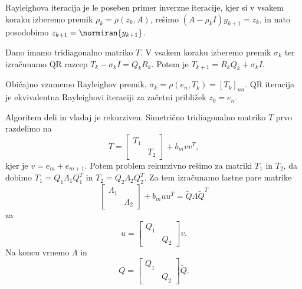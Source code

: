 
Rayleighova iteracija je le poseben primer inverzne iteracije, kjer si v vsakem
koraku izberemo premik $\rho_k = \rho(z_k, A)$, rešimo $(A - \rho_k I) y_{k+1} =
z_k$, in nato posodobimo $z_{k+1} = \normiran{y_{k+1}}$.


Dano imamo tridiagonalno matriko $T$.
V vsakem koraku izberemo premik $\sigma_k$ ter izračunamo QR razcep $T_k -
\sigma_k I = Q_k R_k$.
Potem je $T_{k+1} = R_k Q_k + \sigma_k I$.

Običajno vzamemo Rayleighov premik, $\sigma_k = \rho(e_{n}, T_k) = [T_k]_{nn}$.
QR iteracija je ekvivalentna Rayleighovi iteraciji za začetni približek $z_0 =
e_n$.


Algoritem deli in vladaj je rekurziven.
Simetrično tridiagonalno matriko $T$ prvo razdelimo na
\[
  T =
  \begin{bmatrix}
	T_1 & \\ & T_2
  \end{bmatrix}
  + b_m v v^T,
\]
kjer je $v = e_m + e_{m+1}$.
Potem problem rekurzivno rešimo za matriki $T_1$ in $T_2$, da dobimo $T_1 = Q_1
\Lambda_1 Q_1^T$ in $T_2 = Q_2 \Lambda_2 Q_2^T$.
Za tem izračunamo lastne pare matrike
\[
  \begin{bmatrix}
	\Lambda_1 & \\
	& \Lambda_2
  \end{bmatrix}
  + b_m u u^T
  = \tilde{Q} \Lambda \tilde{Q}^T
\]
za
\[
  u =
  \begin{bmatrix}
	Q_1 & \\ & Q_2
  \end{bmatrix}
  v.
\]
Na koncu vrnemo $\Lambda$ in
\[
  Q =
  \begin{bmatrix}
	Q_1 & \\ & Q_2
  \end{bmatrix}
  \tilde{Q}.
\]

